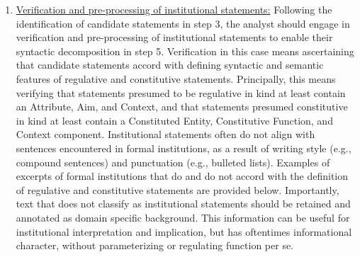 \begin{enumerate}
    All three types of content (preambles, definitions, and policy instructions) should be coded. Preambles are likely to be comprised of self-referential statements that can convey the purpose of, or contextualize, the institution under examination more generally as well as regulative and/or constitutive statements.  In most cases, definitions are constitutive, and can be useful for encoding institutional statements encountered in a policy document; e.g., when some statement clause references something that is defined in the definitions section of the policy document. This is computationally useful [in the coding process] because it allows the computer to reference particular definitions when certain terms inline. It also allows the computer to link statements that share common definitional information in the analysis process.
    
    The critical aspect of this coding step is to ensure that the institutional analyst identifies all relevant, codeable information -- i.e., all information that is comprised of codeable institutional statements. 
    
    \item \underline{Verification and pre-processing of institutional statements:} Following the identification of candidate statements in step 3, the analyst should engage in verification and pre-processing of institutional statements to enable their syntactic decomposition in step 5. Verification in this case means ascertaining that candidate statements accord with defining syntactic and semantic features of regulative and constitutive statements. Principally, this means verifying that statements presumed to be regulative in kind at least contain an Attribute, Aim, and Context, and that statements presumed constitutive in kind at least contain a Constituted Entity, Constitutive Function, and Context component. Institutional statements often do not align with sentences encountered in formal institutions, as a result of writing style (e.g., compound sentences) and punctuation (e.g., bulleted lists). Examples of excerpts of formal institutions that do and do not accord with the definition of regulative and constitutive statements are provided below. Importantly, text that does not classify as institutional statements should be retained and annotated as domain specific background. This information can be useful for institutional interpretation and implication, but has oftentimes informational character, without parameterizing or regulating function per se.


\end{enumerate}
